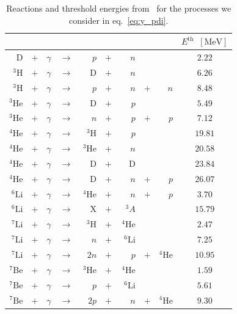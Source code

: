 \documentclass[11pt,a4paper]{article}
\begin{document}
\begin{table}
	\centering
	\begin{tabular}{|rcrcrcrcr|c|}
		\hline
		& & & & & & & & & $E^\text{th}\;\;[\mathrm{MeV}]$\\
		\hline
		$\mathrm{D}$ & $+$ & $\gamma$ & $\rightarrow$ & $p$ & $+$ & $n$ & & & $2.22$\\
		\hline
		$^3\mathrm{H}$ & $+$ & $\gamma$ & $\rightarrow$ & $\mathrm{D}$ & $+$ & $n$ & & & $6.26$\\
		\hline
		$^3\mathrm{H}$ & $+$ & $\gamma$ & $\rightarrow$ & $p$ & $+$ & $n$ & $+$ & $n$ & $8.48$ \\
		\hline
		$^3\mathrm{He}$ & $+$ & $\gamma$ & $\rightarrow$ & $\mathrm{D}$ & $+$ & $p$ & & & $5.49$ \\
		\hline
		$^3\mathrm{He}$ & $+$ & $\gamma$ & $\rightarrow$ & $n$ & $+$ & $p$ & $+$ & $p$ & $7.12$\\
		\hline
		$^4\mathrm{He}$ & $+$ & $\gamma$ & $\rightarrow$ & $^3\mathrm{H}$ & $+$ & $\, p$ & & & $19.81$ \\
		\hline
		$^4\mathrm{He}$ & $+$ & $\gamma$ & $\rightarrow$ & $^{3}\mathrm{He}$ & $+$ & $n$ & & & $20.58$ \\
		\hline
		$^4\mathrm{He}$ & $+$ & $\gamma$ & $\rightarrow$ & $\mathrm{D}$ & $+$ & $\mathrm{D}$ & & & $23.84$ \\
		\hline
		$^4\mathrm{He}$ & $+$ & $\gamma$ & $\rightarrow$ & $\mathrm{D}$ & $+$ & $n$ & $+$ & $p$ & $26.07$ \\
		\hline
		$^6\mathrm{Li}$ & $+$ & $\gamma$ & $\rightarrow$ & $\, ^{4}\mathrm{He}$ & $+$ & $n$ & $+$ & $p$ & $3.70$ \\
		\hline
		$^6\mathrm{Li}$ & $+$ & $\gamma$ & $\rightarrow$ & $\mathrm{X}$ & $+$ &  $\, ^{3}A$ & & & $15.79$ \\
		\hline
		$^7\mathrm{Li}$ & $+$ & $\gamma$ & $\rightarrow$ & $^3\text{H}$ & $+$ &  $\, ^{4}\text{He}$ & & & $2.47$ \\
		\hline
		$^7\mathrm{Li}$ & $+$ & $\gamma$ & $\rightarrow$ & $n$ & $+$ &  $\, ^{6}\text{Li}$ & & & $7.25$ \\
		\hline
		$^7\mathrm{Li}$ & $+$ & $\gamma$ & $\rightarrow$ & $2n$ & $+$ &  $p$ & $+$ & $ ^{4}\text{He}$ & $10.95$ \\
		\hline
		$^7\mathrm{Be}$ & $+$ & $\gamma$ & $\rightarrow$ & $^3\text{He}$ & $+$ &  $ ^{4}\text{He}$ & & & $1.59$ \\
		\hline
		$^7\mathrm{Be}$ & $+$ & $\gamma$ & $\rightarrow$ & $p$ & $+$ &  $ ^{6}\text{Li}$ & & & $5.61$ \\
		\hline
		$^7\mathrm{Be}$ & $+$ & $\gamma$ & $\rightarrow$ & $2p$ & $+$ &  $n$ & $+$ & $ ^{4}\text{He}$ & $9.30$ \\
		\hline
	\end{tabular}
\caption{Reactions and threshold energies from~\cite{Cyburt:2002uv} for the processes we consider in eq.~\eqref{eq:y_pdi}.}
\label{tab:reactions}
\end{table}
\end{document}
